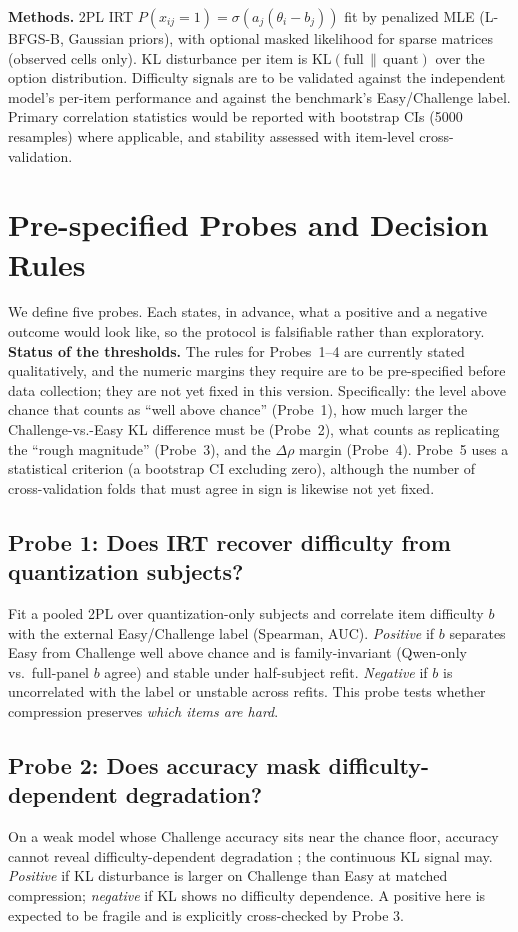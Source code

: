 \documentclass[11pt]{article}
\begin{document}
\textbf{Methods.} 2PL IRT $P(x_{ij}{=}1)=\sigma(a_j(\theta_i-b_j))$ fit by penalized MLE (L-BFGS-B, Gaussian priors), with optional masked likelihood for sparse matrices (observed cells only). KL disturbance per item is $\mathrm{KL}(\text{full}\,\|\,\text{quant})$ over the option distribution. Difficulty signals are to be validated against the independent model's per-item performance and against the benchmark's Easy/Challenge label. Primary correlation statistics would be reported with bootstrap CIs (5000 resamples) where applicable, and stability assessed with item-level cross-validation.

\section{Pre-specified Probes and Decision Rules}
We define five probes. Each states, in advance, what a positive and a negative outcome would look like, so the protocol is falsifiable rather than exploratory. \textbf{Status of the thresholds.} The rules for Probes~1--4 are currently stated qualitatively, and the numeric margins they require are to be pre-specified before data collection; they are not yet fixed in this version. Specifically: the level above chance that counts as ``well above chance'' (Probe~1), how much larger the Challenge-vs.-Easy KL difference must be (Probe~2), what counts as replicating the ``rough magnitude'' (Probe~3), and the $\Delta\rho$ margin (Probe~4). Probe~5 uses a statistical criterion (a bootstrap CI excluding zero), although the number of cross-validation folds that must agree in sign is likewise not yet fixed.

\subsection{Probe 1: Does IRT recover difficulty from quantization subjects?}
Fit a pooled 2PL over quantization-only subjects and correlate item difficulty $b$ with the external Easy/Challenge label (Spearman, AUC). \emph{Positive} if $b$ separates Easy from Challenge well above chance and is family-invariant (Qwen-only vs.\ full-panel $b$ agree) and stable under half-subject refit. \emph{Negative} if $b$ is uncorrelated with the label or unstable across refits. This probe tests whether compression preserves \emph{which items are hard}.

\subsection{Probe 2: Does accuracy mask difficulty-dependent degradation?}
On a weak model whose Challenge accuracy sits near the chance floor, accuracy cannot reveal difficulty-dependent degradation \citep{dutta2024}; the continuous KL signal may. \emph{Positive} if KL disturbance is larger on Challenge than Easy at matched compression; \emph{negative} if KL shows no difficulty dependence. A positive here is expected to be fragile and is explicitly cross-checked by Probe 3.
\end{document}
